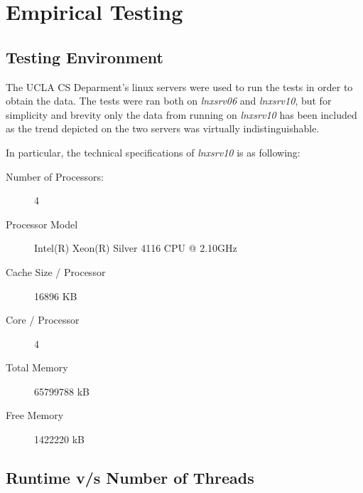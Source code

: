 \section{Empirical Testing}

\subsection{Testing Environment}
The UCLA CS Deparment's linux servers were used to run the tests in order to obtain the data. The tests were ran both on \emph{lnxsrv06} and \emph{lnxsrv10}, but for simplicity and brevity only the data from running on \emph{lnxsrv10} has been included as the trend depicted on the two servers was virtually indistinguishable.


\noindent In particular, the technical specifications of \emph{lnxsrv10} is as following:
\begin{description}
  \item[Number of Processors:] 4
  \item[Processor Model] Intel(R) Xeon(R) Silver 4116 CPU @ 2.10GHz
  \item[Cache Size / Processor] 16896 KB
  \item[Core / Processor] 4
  \item[Total Memory] 65799788 kB
  \item[Free Memory] 1422220 kB
\end{description}

\subsection{Runtime v/s Number of Threads}
\begin{table}[!htbp]
\centering
{}
\end{table}

